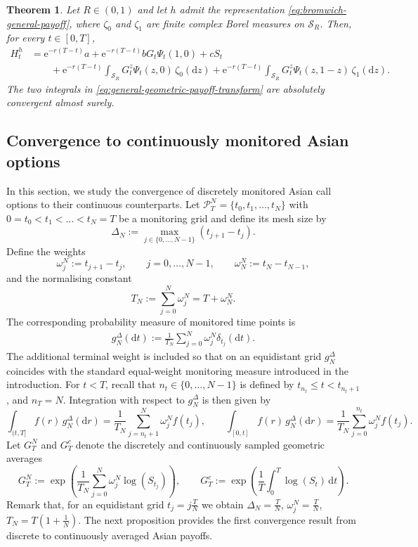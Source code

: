 \documentclass[10pt,a4paper,reqno]{amsart}
\theoremstyle{plain}
\newtheorem{theorem}{Theorem}[section]
\theoremstyle{definition}
\theoremstyle{remark}
\theoremstyle{example}
\begin{document}
\begin{theorem}\label{thm:general-geometric-payoff-pricing}
    Let $R\in(0,1)$ and let $h$ admit the representation \eqref{eq:bromwich-general-payoff}, where $\zeta_0$ and $\zeta_1$ are finite complex Borel measures on $\mathcal{S}_R$. Then, for every $t\in[0,T]$,
    \begin{align}\label{eq:general-geometric-payoff-transform}
        H_t^h &= \mathrm{e}^{-r(T-t)}a + \mathrm{e}^{-r(T-t)} bG_t\Psi_t(1,0) + cS_t
        \nonumber
        \\ &\qquad + \mathrm{e}^{-r(T-t)} \int_{\mathcal{S}_R} G_t^z\Psi_t(z,0)\, \zeta_0(\mathrm{d}z) + \mathrm{e}^{-r(T-t)} \int_{\mathcal{S}_R} G_t^z\Psi_t(z,1-z)\, \zeta_1(\mathrm{d}z).
    \end{align}
    The two integrals in \eqref{eq:general-geometric-payoff-transform} are absolutely convergent almost surely.
\end{theorem}


\subsection{Convergence to continuously monitored Asian options}\label{secconvtocont}

In this section, we study the convergence of discretely monitored Asian call options 
to their continuous counterparts. Let $\mathcal{P}_T^N=\{t_0,t_1,\dots,t_N\}$ with $0=t_0<t_1<\dots<t_N=T$ be a monitoring grid and define its mesh size by 
\[
    \Delta_N:=\max_{j\in\{0,\dots,N-1\}}(t_{j+1}-t_j).
\]
Define the weights
\[
    \omega_j^N:=t_{j+1}-t_j,\qquad j=0,\dots,N-1, \qquad \omega_N^N:=t_N-t_{N-1},
\]
and the normalising constant
\[
    T_N:=\sum_{j=0}^N\omega_j^N=T+\omega_N^N.
\]
The corresponding probability measure of monitored time points is
\begin{align}\label{eq:gN-delta-general}
    g_N^\Delta(\mathrm{d}t) := \frac{1}{T_N}\sum_{j=0}^N\omega_j^N\delta_{t_j}(\mathrm{d}t).
\end{align}
The additional terminal weight is included so that on an equidistant grid \(g_N^\Delta\) coincides with the standard equal-weight monitoring measure introduced in the introduction. For $t<T$, recall that $n_t\in\{0,\dots,N-1\}$ is defined by $t_{n_t}\leq t<t_{n_t+1}$, and $n_T=N$. Integration with respect to $g_N^\Delta$ is then given by
\[
    \int_{(t,T]}f(r)\,g_N^\Delta(\mathrm{d}r) = \frac{1}{T_N}\sum_{j=n_t+1}^{N}\omega_j^N f(t_j),
    \qquad \int_{[0,t]}f(r)\,g_N^\Delta(\mathrm{d}r) = \frac{1}{T_N}\sum_{j=0}^{n_t}\omega_j^N f(t_j).
\]
Let $G_T^N$ and $G_T^c$ denote the discretely and continuously sampled
geometric averages
\[
    G_T^N := \exp\left( \frac{1}{T_N}\sum_{j=0}^{N}\omega_j^N\log(S_{t_j}) \right),
    \qquad G_T^c := \exp\left( \frac{1}{T}\int_0^T\log(S_t)\,\mathrm{d}t \right).
\]
Remark that, for an equidistant grid $t_j = j \frac{T}{N}$ we obtain $\Delta_N = \frac{T}{N}$, $\omega_j^N = \frac{T}{N}$, $T_N = T\left( 1 + \frac{1}{N}\right)$. The next proposition provides the first convergence result from discrete to continuously averaged Asian payoffs.
\end{document}
